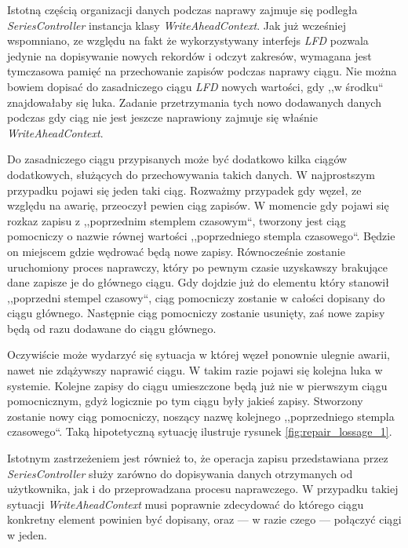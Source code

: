 \documentclass[a4paper,polish,12pt,twoside]{article}
\newcommand{\WorkLineSpread}{1.5}
\begin{document}
\begin{listing}
\linespread{1} \small  \linespread{\WorkLineSpread} \normalsize
\end{listing}

Istotną częścią organizacji danych podczas naprawy zajmuje się podległa \textit{SeriesController} instancja klasy \textit{WriteAheadContext}. Jak już wcześniej wspomniano, ze względu na fakt że wykorzystywany interfejs \textit{LFD} pozwala jedynie na dopisywanie nowych rekordów i odczyt zakresów, wymagana jest tymczasowa pamięć na przechowanie zapisów podczas naprawy ciągu. Nie można bowiem dopisać do zasadniczego ciągu \textit{LFD} nowych wartości, gdy ,,w środku`` znajdowałaby się luka. Zadanie przetrzymania tych nowo dodawanych danych podczas gdy ciąg nie jest jeszcze naprawiony zajmuje się właśnie \textit{WriteAheadContext}.

Do zasadniczego ciągu przypisanych może być dodatkowo kilka ciągów dodatkowych, służących do przechowywania takich danych. W najprostszym przypadku pojawi się jeden taki ciąg. Rozważmy przypadek gdy węzeł, ze względu na awarię, przeoczył pewien ciąg zapisów. W momencie gdy pojawi się rozkaz zapisu z ,,poprzednim stemplem czasowym``, tworzony jest ciąg pomocniczy o nazwie równej wartości ,,poprzedniego stempla czasowego``. Będzie on miejscem gdzie wędrować będą nowe zapisy. Równocześnie zostanie uruchomiony proces naprawczy, który po pewnym czasie uzyskawszy brakujące dane zapisze je do głównego ciągu. Gdy dojdzie już do elementu który stanowił ,,poprzedni stempel czasowy``, ciąg pomocniczy zostanie w całości dopisany do ciągu głównego. Następnie ciąg pomocniczy zostanie usunięty, zaś nowe zapisy będą od razu dodawane do ciągu głównego.

Oczywiście może wydarzyć się sytuacja w której węzeł ponownie ulegnie awarii, nawet nie zdążywszy naprawić ciągu. W takim razie pojawi się kolejna luka w systemie. Kolejne zapisy do ciągu umieszczone będą już nie w pierwszym ciągu pomocnicznym, gdyż logicznie po tym ciągu były jakieś zapisy. Stworzony zostanie nowy ciąg pomocniczy, noszący nazwę kolejnego ,,poprzedniego stempla czasowego``. Taką hipotetyczną sytuację ilustruje rysunek \ref{fig:repair_lossage_1}. 

Istotnym zastrzeżeniem jest również to, że operacja zapisu przedstawiana przez \textit{SeriesController} służy zarówno do dopisywania danych otrzymanych od użytkownika, jak i do przeprowadzana procesu naprawczego. W przypadku takiej sytuacji \textit{WriteAheadContext} musi poprawnie zdecydować do którego ciągu konkretny element powinien być dopisany, oraz --- w razie czego --- połączyć ciągi w jeden.
\end{document}
